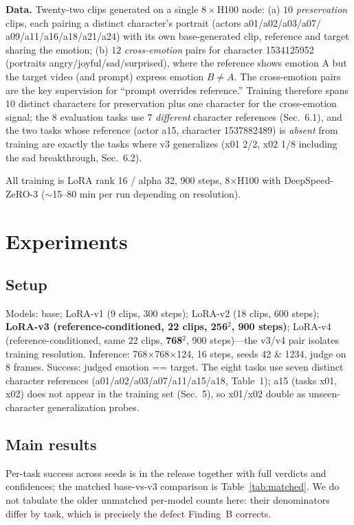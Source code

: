 \documentclass[10pt,twocolumn]{article}
\begin{document}
\textbf{Data.} Twenty-two clips generated on a single $8\times$H100 node: (a) $10$
\emph{preservation} clips, each pairing a distinct character's portrait (actors a01/a02/a03/a07/
a09/a11/a16/a18/a21/a24) with its own base-generated clip, reference and target sharing the emotion;
(b) $12$ \emph{cross-emotion} pairs for character 1534125952 (portraits angry/joyful/sad/surprised),
where the reference shows emotion A but the target video (and prompt) express emotion $B\neq A$. The
cross-emotion pairs are the key supervision for ``prompt overrides reference.'' Training therefore
spans $10$ distinct characters for preservation plus one character for the cross-emotion signal; the
$8$ evaluation tasks use $7$ \emph{different} character references (Sec.~6.1), and the two tasks
whose reference (actor a15, character 1537882489) is \emph{absent} from training are exactly the
tasks where v3 generalizes (x01 2/2, x02 1/8 including the sad breakthrough, Sec.~6.2).

All training is LoRA rank 16 / alpha 32, 900 steps, 8$\times$H100 with DeepSpeed-ZeRO-3
($\sim$15--80 min per run depending on resolution).

\section{Experiments}
\subsection{Setup}
Models: base; LoRA-v1 (9 clips, 300 steps); LoRA-v2 (18 clips, 600 steps); \textbf{LoRA-v3
(reference-conditioned, 22 clips, 256$^2$, 900 steps)}; LoRA-v4 (reference-conditioned, same 22
clips, \textbf{768$^2$}, 900 steps)---the v3/v4 pair isolates training resolution. Inference:
768$\times$768$\times$124, 16 steps, seeds 42 \& 1234, judge on 8 frames. Success: judged emotion
== target. The eight tasks use seven distinct character references (a01/a02/a03/a07/a11/a15/a18,
Table~1); a15 (tasks x01, x02) does not appear in the training set (Sec.~5), so x01/x02 double as
unseen-character generalization probes.

\subsection{Main results}
Per-task success across seeds is in the release together with full verdicts and confidences; the
matched base-vs-v3 comparison is Table~\ref{tab:matched}. We do not tabulate the older unmatched
per-model counts here: their denominators differ by task, which is precisely the defect Finding~B
corrects.
\end{document}
